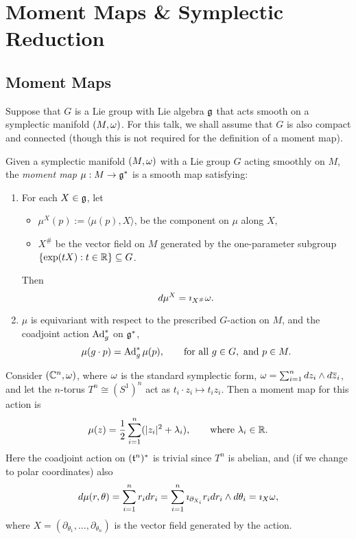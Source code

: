 \section{Moment Maps \& Symplectic Reduction}

\subsection{Moment Maps}

Suppose that $G$ is a Lie group with Lie algebra $\mathfrak{g}$ that acts smooth on a symplectic manifold $(M,\omega)$. For this talk, we shall assume that $G$ is also compact and connected (though this is not required for the definition of a moment map).

\begin{defn}
	Given a symplectic manifold $(M,\omega)$ with a Lie group $G$ acting smoothly on $M$, the \emph{moment map} $\mu: M \rightarrow \mathfrak{g}^{\ast}$ is a smooth map satisfying:
	\begin{enumerate}
		\item For each $X \in \mathfrak{g}$, let
		\begin{itemize}
			\item $\mu^{X}(p) := \langle \mu(p), X \rangle$, be the component on $\mu$ along $X$,
			\item $X^{\#}$ be the vector field on $M$ generated by the one-parameter subgroup $\{\exp(tX) : t\in \mathbb{R}  \} \subseteq G$.
		\end{itemize}
		Then
		$$
			d\mu^{X} = \imath_{X^{\#}}\omega.
		$$
		\item $\mu$ is equivariant with respect to the prescribed $G$-action on $M$, and the coadjoint action $\operatorname{Ad}_{g}^{\ast}$ on $\mathfrak{g}^{\ast}$, \ie
		$$
			\mu(g\cdot p) = \operatorname{Ad}_{g}^{\ast}\mu(p),\qquad \text{for all } g\in G,\text{ and } p \in M.
		$$
	\end{enumerate}
\end{defn}

\begin{ex}
	Consider $(\mathbb{C}^{n},\omega)$, where $\omega$ is the standard symplectic form, $\omega = \sum_{i=1}^{n}dz_{i}\wedge d\overline{z}_{i}$, and let the $n$-torus $T^{n} \cong (S^{1})^{n}$ act as	$t_{i} \cdot z_{i} \mapsto t_{i}z_{i}$. Then a moment map for this action is
	$$
		\mu(z) = \frac{1}{2}\sum_{i=1}^{n}(|z_{i}|^{2} + \lambda_{i}),\qquad \text{where } \lambda_{i} \in \mathbb{R}.
	$$
	Here the coadjoint action on $(\mathfrak{t}^{n})^{\ast}$ is trivial since $T^{n}$ is abelian, and (if we change to polar coordinates) also
	$$
		d\mu(r,\theta) = \sum_{i=1}^{n}r_{i} dr_{i} = \sum_{i=1}^{n}\imath_{\partial_{X_{i}}} r_{i} dr_{i} \wedge d\theta_{i} = \imath_{X} \omega,
	$$
	where $X = (\partial_{\theta_{1}},\ldots, \partial_{\theta_{n}})$ is the vector field generated by the action.
\end{ex}

